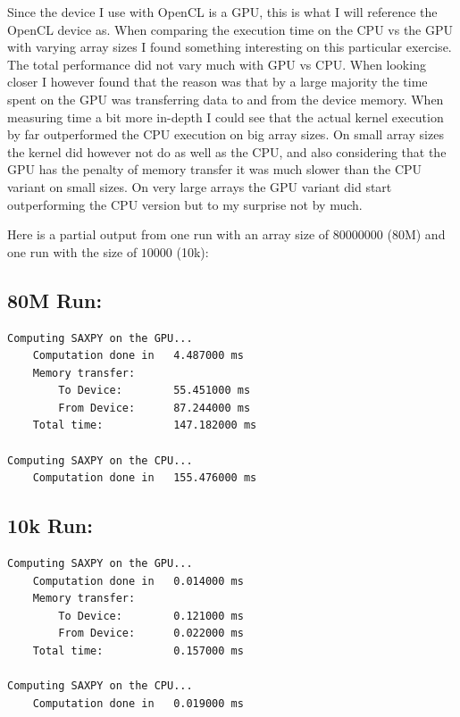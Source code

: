 \documentclass[a4paper, 12pt]{article}
\begin{document}
Since the device I use with OpenCL is a GPU, this is what I will reference the OpenCL device as. When comparing the execution time on the CPU vs the GPU with varying array sizes I found something interesting on this particular exercise. The total performance did not vary much with GPU vs CPU. When looking closer I however found that the reason was that by a large majority the time spent on the GPU was transferring data to and from the device memory. When measuring time a bit more in-depth I could see that the actual kernel execution by far outperformed the CPU execution on big array sizes. On small array sizes the kernel did however not do as well as the CPU, and also considering that the GPU has the penalty of memory transfer it was much slower than the CPU variant on small sizes. On very large arrays the GPU variant did start outperforming the CPU version but to my surprise not by much.

Here is a partial output from one run with an array size of $80 000 000$ (80M) and one run with the size of $10000$ (10k):

\subsection{80M Run:}
\begin{verbatim}
Computing SAXPY on the GPU...
    Computation done in   4.487000 ms
    Memory transfer:
        To Device:        55.451000 ms
        From Device:      87.244000 ms
    Total time:           147.182000 ms

Computing SAXPY on the CPU...
    Computation done in   155.476000 ms
\end{verbatim}

\subsection{10k Run:}
\begin{verbatim}
Computing SAXPY on the GPU...
    Computation done in   0.014000 ms
    Memory transfer:
        To Device:        0.121000 ms
        From Device:      0.022000 ms
    Total time:           0.157000 ms

Computing SAXPY on the CPU...
    Computation done in   0.019000 ms
\end{verbatim}

%
%
%
\end{document}
